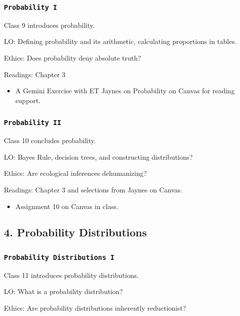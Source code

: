 \documentclass[11pt,]{article}
\begin{document}
\subsubsection{\texorpdfstring{\texttt{Probability\ I}}{Probability I}}\label{probability-i}

Class 9 introduces probability.

LO: Defining probability and its arithmetic, calculating proportions in
tables.

Ethics: Does probability deny absolute truth?

Readings: Chapter 3

\begin{itemize}
\item A Gemini Exercise with ET Jaynes on Probability on Canvas for reading support.
\end{itemize}

\subsubsection{\texorpdfstring{\texttt{Probability\ II}}{Probability II}}\label{probability-ii}

Class 10 concludes probability.

LO: Bayes Rule, decision trees, and constructing distributions?

Ethics: Are ecological inferences dehumanizing?

Readings: Chapter 3 and selections from Jaynes on Canvas.

\begin{itemize}
\item Assignment 10 on Canvas in class.
\end{itemize}

\subsection{4. Probability
Distributions}\label{probability-distributions}

\subsubsection{\texorpdfstring{\texttt{Probability\ Distributions\ I}}{Probability Distributions I}}\label{probability-distributions-i}

Class 11 introduces probability distributions.

LO: What is a probability distribution?

Ethics: Are probability distributions inherently reductionist?
\end{document}
